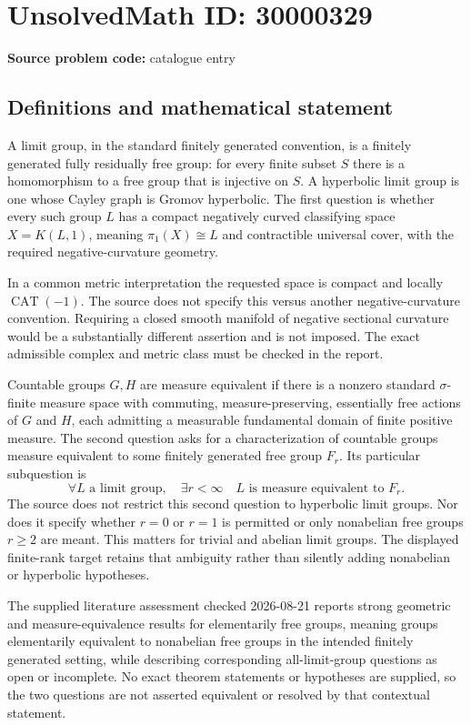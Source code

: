 \documentclass[11pt]{article}
\begin{document}
\section*{UnsolvedMath ID: 30000329}
\textbf{Source problem code:} catalogue entry
\subsection{Definitions and mathematical statement}
A limit group, in the standard finitely generated convention, is a finitely generated fully residually free group: for every finite subset \(S\) there is a homomorphism to a free group that is injective on \(S\). A hyperbolic limit group is one whose Cayley graph is Gromov hyperbolic. The first question is whether every such group \(L\) has a compact negatively curved classifying space \(X=K(L,1)\), meaning \(\pi_1(X)\cong L\) and contractible universal cover, with the required negative-curvature geometry.

In a common metric interpretation the requested space is compact and locally \(\operatorname{CAT}(-1)\). The source does not specify this versus another negative-curvature convention. Requiring a closed smooth manifold of negative sectional curvature would be a substantially different assertion and is not imposed. The exact admissible complex and metric class must be checked in the report.

Countable groups \(G,H\) are measure equivalent if there is a nonzero standard \(\sigma\)-finite measure space with commuting, measure-preserving, essentially free actions of \(G\) and \(H\), each admitting a measurable fundamental domain of finite positive measure. The second question asks for a characterization of countable groups measure equivalent to some finitely generated free group \(F_r\). Its particular subquestion is
\[
\forall L\text{ a limit group},\quad\exists r<\infty\quad L\text{ is measure equivalent to }F_r.
\]
The source does not restrict this second question to hyperbolic limit groups. Nor does it specify whether \(r=0\) or \(r=1\) is permitted or only nonabelian free groups \(r\geq2\) are meant. This matters for trivial and abelian limit groups. The displayed finite-rank target retains that ambiguity rather than silently adding nonabelian or hyperbolic hypotheses.

The supplied literature assessment checked 2026-08-21 reports strong geometric and measure-equivalence results for elementarily free groups, meaning groups elementarily equivalent to nonabelian free groups in the intended finitely generated setting, while describing corresponding all-limit-group questions as open or incomplete. No exact theorem statements or hypotheses are supplied, so the two questions are not asserted equivalent or resolved by that contextual statement.
\end{document}
